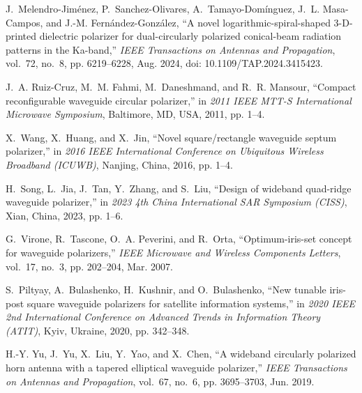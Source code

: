 \documentclass[journal]{IEEEtran}
\begin{document}
\begin{thebibliography}{24}
    J.~Melendro-Jiménez, P.~Sanchez-Olivares, A.~Tamayo-Domínguez, J.~L. Masa-Campos, and J.-M. Fernández-González, ``A novel logarithmic-spiral-shaped 3-D-printed dielectric polarizer for dual-circularly polarized conical-beam radiation patterns in the Ka-band,'' \emph{IEEE Transactions on Antennas and Propagation}, vol.~72, no.~8, pp. 6219--6228, Aug. 2024, doi: 10.1109/TAP.2024.3415423.
    
    J.~A. Ruiz-Cruz, M.~M. Fahmi, M.~Daneshmand, and R.~R. Mansour, ``Compact reconfigurable waveguide circular polarizer,'' in \emph{2011 IEEE MTT-S International Microwave Symposium}, Baltimore, MD, USA, 2011, pp. 1--4.
    
    X.~Wang, X.~Huang, and X.~Jin, ``Novel square/rectangle waveguide septum polarizer,'' in \emph{2016 IEEE International Conference on Ubiquitous Wireless Broadband (ICUWB)}, Nanjing, China, 2016, pp. 1--4.
    
    H.~Song, L.~Jia, J.~Tan, Y.~Zhang, and S.~Liu, ``Design of wideband quad-ridge waveguide polarizer,'' in \emph{2023 4th China International SAR Symposium (CISS)}, Xian, China, 2023, pp. 1--6.
    
    G.~Virone, R.~Tascone, O.~A. Peverini, and R.~Orta, ``Optimum-iris-set concept for waveguide polarizers,'' \emph{IEEE Microwave and Wireless Components Letters}, vol.~17, no.~3, pp. 202--204, Mar. 2007.
    
    S.~Piltyay, A.~Bulashenko, H.~Kushnir, and O.~Bulashenko, ``New tunable iris-post square waveguide polarizers for satellite information systems,'' in \emph{2020 IEEE 2nd International Conference on Advanced Trends in Information Theory (ATIT)}, Kyiv, Ukraine, 2020, pp. 342--348.
    
    H.-Y. Yu, J.~Yu, X.~Liu, Y.~Yao, and X.~Chen, ``A wideband circularly polarized horn antenna with a tapered elliptical waveguide polarizer,'' \emph{IEEE Transactions on Antennas and Propagation}, vol.~67, no.~6, pp. 3695--3703, Jun. 2019.
    

\end{thebibliography}
\end{document}
